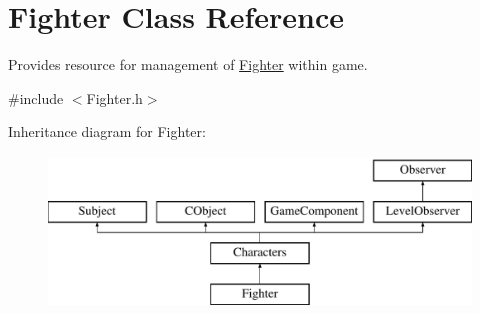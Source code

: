 \hypertarget{class_fighter}{}\section{Fighter Class Reference}
\label{class_fighter}


Provides resource for management of \hyperlink{class_fighter}{Fighter} within game.  




{\ttfamily \#include $<$Fighter.\+h$>$}

Inheritance diagram for Fighter\+:\begin{figure}[H]
\begin{center}
\leavevmode
\includegraphics[height=4.000000cm]{class_fighter}
\end{center}
\end{figure}

